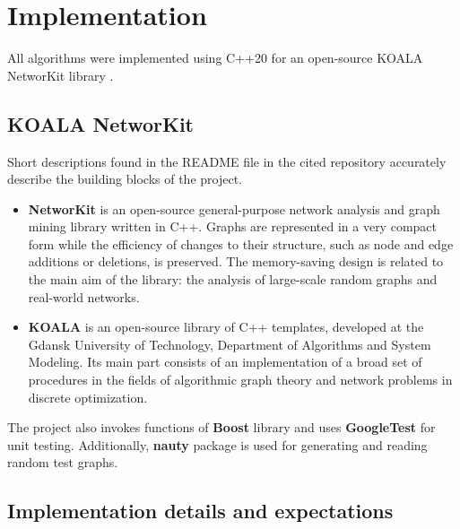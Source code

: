 \label{chp:benchmark}
\section{Implementation}

All algorithms were implemented using C++20 for an open-source KOALA NetworKit library \cite{koala-networkit}. 

\subsection{KOALA NetworKit}

Short descriptions found in the README file in the cited repository accurately describe the building blocks of the project.

\begin{itemize}
    \item \textbf{NetworKit} is an open-source general-purpose network analysis and graph mining library written in C++. Graphs are represented in a very compact form while the efficiency of changes to their structure, such as node and edge additions or deletions, is preserved. The memory-saving design is related to the main aim of the library: the analysis of large-scale random graphs and real-world networks.
    \item \textbf{KOALA} is an open-source library of C++ templates, developed at the Gdansk University of Technology, Department of Algorithms and System Modeling. Its main part consists of an implementation of a broad set of procedures in the fields of algorithmic graph theory and network problems in discrete optimization.
\end{itemize}

The project also invokes functions of \textbf{Boost} library and uses \textbf{GoogleTest} for unit testing. Additionally, \textbf{nauty} package is used for generating and reading random test graphs.

\subsection{Implementation details and expectations}

